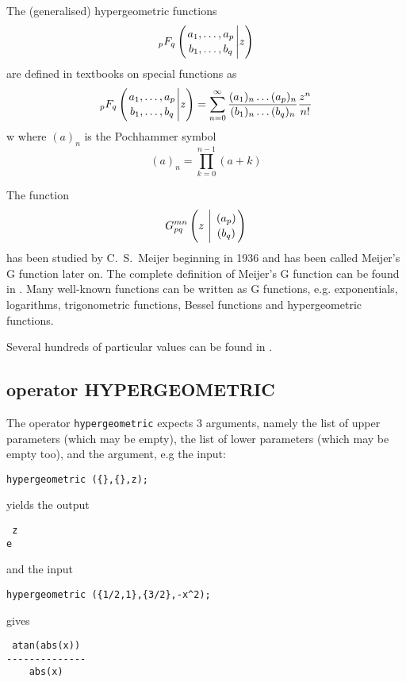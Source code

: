 
The (generalised) hypergeometric functions  
\begin{displaymath}
_pF_q \left( \genfrac{}{}{0pt}{}{a_1, \ldots , a_p}{b_1, \ldots ,b_q} \Bigg\vert z \right)
\end{displaymath}
are defined in textbooks on special functions as
\begin{displaymath}
_pF_q \left( \genfrac{}{}{0pt}{}{a_1, \ldots , a_p}{b_1, \ldots ,b_q} \Bigg\vert z \right)
  = \sum_{n=0}^{\infty}\frac{(a_{1})_{n}\dots(a_{p})_{n}}{(b_{1})_{n}\dots(b_{q})_{n}}\frac{z^{n}}{n!}
\end{displaymath}w
where $(a)_{n}$ is the Pochhammer symbol
\begin{displaymath}
 (a)_{n} = \prod_{k=0}^{n-1} (a+k)
\end{displaymath}

The function 
\begin{displaymath}
G_{p q}^{m n} \left( z \  \Bigg\vert \  \genfrac{}{}{0pt}{}{(a_p)}{(b_q)} \right)
\end{displaymath}
has been studied by C.~S.~Meijer beginning in 1936 and has been
called Meijer's G function later on. The complete definition of Meijer's
G function can be found in \cite{Prudnikov:90c}.
Many well-known functions can be written as G functions,
e.g. exponentials, logarithms, trigonometric functions, Bessel functions
and hypergeometric functions.

Several hundreds of particular values can be found in \cite{Prudnikov:90c}.


\subsection{\REDUCE{} operator HYPERGEOMETRIC}
\hypertarget{operator:HYPERGEOMETRIC}{}

The operator {\tt hypergeometric} expects 3 arguments, namely the 
list of upper parameters (which may be empty), the list of lower
parameters (which may be empty too), and the argument, e.g the input:
\begin{verbatim}
hypergeometric ({},{},z);
\end{verbatim}
yields the output
\begin{verbatim}
 z
e
\end{verbatim}
and the input
\begin{verbatim}
hypergeometric ({1/2,1},{3/2},-x^2);
\end{verbatim}
gives
\begin{verbatim}
 atan(abs(x))
--------------
    abs(x)
\end{verbatim}


